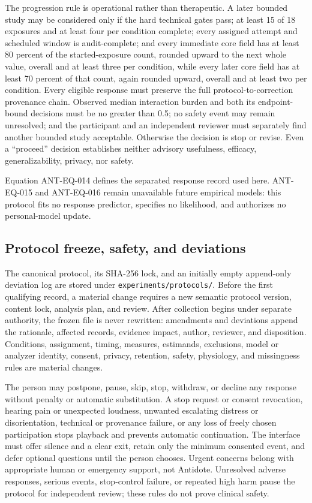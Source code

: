 The progression rule is operational rather than therapeutic. A later bounded
study may be considered only if the hard technical gates pass; at least 15 of
18 exposures and at least four per condition complete; every assigned attempt
and scheduled window is audit-complete; and every immediate core field has at
least 80 percent of the started-exposure count, rounded upward to the next whole
value, overall and at least three per condition, while every later core field
has at least 70 percent of that count, again rounded upward, overall and at
least two per condition.
Every eligible response must preserve the full protocol-to-correction
provenance chain. Observed median interaction burden and both its endpoint-bound
decisions must be no greater than 0.5; no safety event may remain unresolved;
and the participant and an independent reviewer must separately find another
bounded study acceptable. Otherwise the decision is stop or revise. Even a
``proceed'' decision establishes neither advisory usefulness, efficacy,
generalizability, privacy, nor safety.

Equation ANT-EQ-014 defines the separated response record used here.
ANT-EQ-015 and ANT-EQ-016 remain unavailable future empirical models: this
protocol fits no response predictor, specifies no likelihood, and authorizes no
personal-model update.

\subsection{Protocol freeze, safety, and deviations}
\label{sec:methods-protocol-freeze}

The canonical protocol, its SHA-256 lock, and an initially empty append-only
deviation log are stored under \texttt{experiments/protocols/}. Before the first
qualifying record, a material change requires a new semantic protocol version,
content lock, analysis plan, and review. After collection begins under separate
authority, the frozen file is never rewritten: amendments and deviations append
the rationale, affected records, evidence impact, author, reviewer, and
disposition. Conditions, assignment, timing, measures, estimands, exclusions,
model or analyzer identity, consent, privacy, retention, safety, physiology,
and missingness rules are material changes.

The person may postpone, pause, skip, stop, withdraw, or decline any response
without penalty or automatic substitution. A stop request or consent revocation,
hearing pain or unexpected loudness, unwanted escalating distress or
disorientation, technical or provenance failure, or any loss of freely chosen
participation stops playback and prevents automatic continuation. The interface
must offer silence and a clear exit, retain only the minimum consented event,
and defer optional questions until the person chooses. Urgent concerns belong
with appropriate human or emergency support, not Antidote. Unresolved adverse
responses, serious events, stop-control failure, or repeated high harm pause the
protocol for independent review; these rules do not prove clinical safety.

